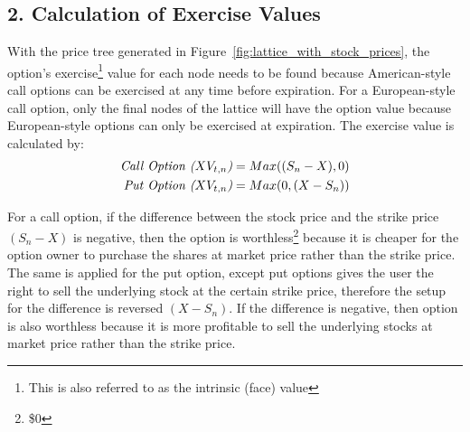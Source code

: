 \documentclass[12pt, letterpaper]{article}\usepackage{float}
\begin{document}
\pagebreak
\subsection*{2. Calculation of Exercise Values}
With the price tree generated in Figure~\ref{fig:lattice_with_stock_prices}, the option's exercise\footnote{This is also referred to as the intrinsic (face) value} value for each node needs to be found because American-style call options can be exercised at any time before expiration.
For a European-style call option, only the final nodes of the lattice will have the option value because European-style options can only be exercised at expiration. 
The exercise value is calculated \cite{bopmwikipedia} by:
\begin{align*}
  \text{\textit{Call Option (${XV_{t,n}}$)}} &= Max({(S_n - X)}, 0) \\
  \text{\textit{Put Option (${XV_{t,n}}$)}} &= Max(0, {(X - S_n)}) 
\end{align*}

\bigskip

For a call option, if the difference between the stock price and the strike price ${(S_n - X)}$ is negative, then the option is worthless\footnote{\$0} because it is cheaper for the option owner to purchase the shares at market price rather than the strike price.
The same is applied for the put option, except put options gives the user the right to sell the underlying stock at the certain strike price, therefore the setup for the difference is reversed ${(X - S_n)}$.
If the difference is negative, then option is also worthless because it is more profitable to sell the underlying stocks at market price rather than the strike price.
\end{document}
